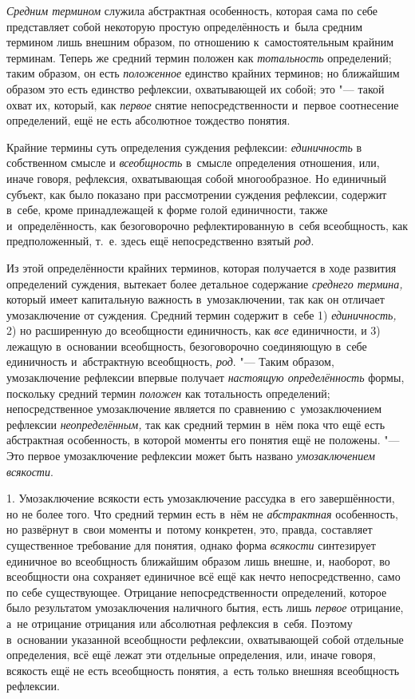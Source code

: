 {\em Средним термином}
служила абстрактная особенность, которая сама по себе
представляет собой некоторую простую определённость и~была средним термином
лишь внешним образом, по отношению к~самостоятельным крайним терминам.
Теперь же средний термин положен как
{\em тотальность}
определений; таким образом, он есть
{\em положенное} единство
крайних терминов; но ближайшим образом это есть единство рефлексии,
охватывающей их собой; это "--- такой охват их, который, как
{\em первое} снятие
непосредственности и~первое соотнесение определений, ещё не есть абсолютное
тождество понятия.

Крайние термины суть определения суждения рефлексии:
{\em единичность} в
собственном смысле и {\em всеобщность}
в~смысле определения отношения, или, иначе говоря, рефлексия,
охватывающая собой многообразное. Но единичный субъект, как было показано
при рассмотрении суждения рефлексии, содержит в~себе, кроме принадлежащей к
форме голой единичности, также и~определённость, как безоговорочно
рефлектированную в~себя всеобщность, как предположенный, т.~е. здесь ещё
непосредственно взятый {\em род}.

Из этой определённости крайних терминов, которая получается в
ходе развития определений суждения, вытекает более детальное содержание
{\em среднего термина,}
который имеет капитальную важность в~умозаключении, так как
он отличает умозаключение от суждения. Средний термин содержит в~себе 1)
{\em единичность,} 2) но
расширенную до всеобщности единичность, как
{\em все} единичности, и
3) лежащую в~основании всеобщность, безоговорочно соединяющую в~себе
единичность и~абстрактную всеобщность,
{\em род}. "--- Таким
образом, умозаключение рефлексии впервые получает
{\em настоящую определённость}
формы, поскольку средний термин
{\em положен} как
тотальность определений; непосредственное умозаключение является
по сравнению с~умозаключением рефлексии
{\em неопределённым,} так
как средний термин в~нём пока что ещё есть абстрактная особенность, в
которой моменты его понятия ещё не положены. "--- Это первое
умозаключение рефлексии может быть названо
{\em умозаключением
всякости}.


1. Умозаключение всякости есть умозаключение рассудка в~его
завершённости, но не более того. Что средний термин есть в~нём не
{\em абстрактная}
особенность, но развёрнут в~свои моменты и~потому конкретен,
это, правда, составляет существенное требование для понятия, однако форма
{\em всякости}
синтезирует единичное во всеобщность ближайшим образом лишь
внешне, и, наоборот, во всеобщности она сохраняет единичное всё ещё как
нечто непосредственно, само по себе существующее. Отрицание
непосредственности определений, которое было результатом умозаключения
наличного бытия, есть лишь {\em первое}
отрицание, а~не отрицание отрицания или абсолютная рефлексия
в~себя. Поэтому в~основании указанной всеобщности рефлексии, охватывающей
собой отдельные определения, всё ещё лежат эти отдельные определения, или,
иначе говоря, всякость ещё не есть всеобщность понятия, а~есть только
внешняя всеобщность рефлексии.

